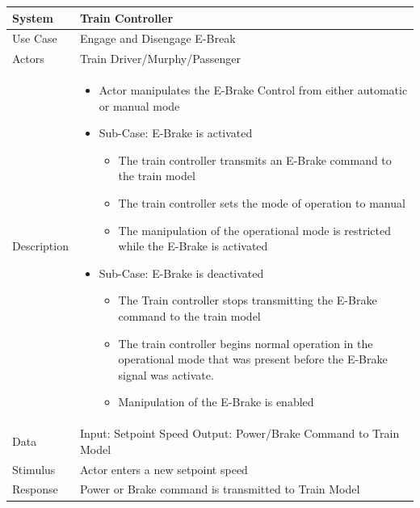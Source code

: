 \documentclass{article}
\begin{document}
    \begin{longtable}{
    || >{\raggedright\arraybackslash}m{}
    | >{\raggedright\arraybackslash}m{}||}
    \hline
    \textbf{System} & \textbf{Train Controller} \\
    \hline
    Use Case & Engage and Disengage E-Break\\
    \hline
    Actors & Train Driver/Murphy/Passenger\\
    \hline
    Description & \begin{itemize}
        \item Actor manipulates the E-Brake Control from either automatic or manual mode
        \item Sub-Case: E-Brake is activated 
        \begin{itemize}
            \item The train controller transmits an E-Brake command to the train model
            \item The train controller sets the mode of operation to manual
            \item The manipulation of the operational mode is restricted while the E-Brake is activated
        \end{itemize}
        \item Sub-Case: E-Brake is deactivated
        \begin{itemize}
            \item The Train controller stops transmitting the E-Brake command to the train model
            \item The train controller begins normal operation in the operational mode that was present before the E-Brake signal was activate.
            \item Manipulation of the E-Brake is enabled
        \end{itemize}
        
    \end{itemize}\\
    \hline
    Data & Input: Setpoint Speed \newline Output: Power/Brake Command to Train Model\\
    \hline
    Stimulus & Actor enters a new setpoint speed\\
    \hline
    Response & Power or Brake command is transmitted to Train Model\\
    \hline
    \end{longtable}
    
\end{document}
